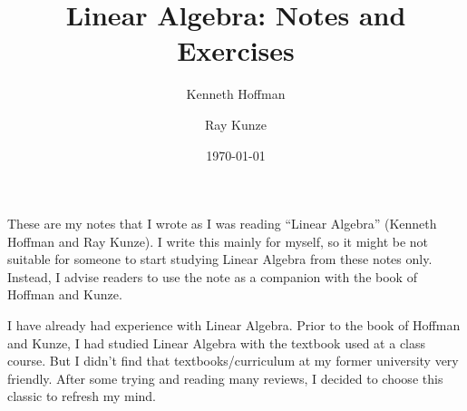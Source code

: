 \documentclass{hoffman-and-kunze-linear-algebra}
\title{Linear Algebra: Notes and Exercises}
\author{Kenneth Hoffman\and Ray Kunze}
\date{\today}
\begin{document}
\maketitle

These are my notes that I wrote as I was reading ``Linear Algebra'' (Kenneth Hoffman and Ray Kunze). I write this mainly for myself, so it might be not suitable for someone to start studying Linear Algebra from these notes only. Instead, I advise readers to use the note as a companion with the book of Hoffman and Kunze.

I have already had experience with Linear Algebra. Prior to the book of Hoffman and Kunze, I had studied Linear Algebra with the textbook used at a class course. But I didn't find that textbooks/curriculum at my former university very friendly. After some trying and reading many reviews, I decided to choose this classic to refresh my mind.

\tableofcontents











\end{document}
